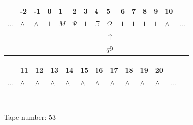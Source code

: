 \documentclass[11pt]{article}
\begin{document}
\begin{table}[H]
\centering
\begin{tabular}{lllllllllllllll}
 & -2 & -1 & 0 & 1 & 2 & 3 & 4 & 5 & 6 & 7 & 8 & 9 & 10 & \\
\hline
$...$ & \multicolumn{1}{|l|}{$\wedge$} & \multicolumn{1}{|l|}{$\wedge$} & \multicolumn{1}{|l|}{$1$} & \multicolumn{1}{|l|}{$M$} & \multicolumn{1}{|l|}{$\Psi$} & \multicolumn{1}{|l|}{$1$} & \multicolumn{1}{|l|}{$\Xi$} & \multicolumn{1}{|l|}{$\Omega$} & \multicolumn{1}{|l|}{$1$} & \multicolumn{1}{|l|}{$1$} & \multicolumn{1}{|l|}{$1$} & \multicolumn{1}{|l|}{$1$} & \multicolumn{1}{|l|}{$\wedge$} & $...$\\
\hline
&  &  &  &  &  &  &  & $\uparrow$ &  &  &  &  &  &  \\
&  &  &  &  &  &  &  & $ q9 $ &  &  &  &  &  &  \\
\end{tabular}
\begin{tabular}{llllllllllll}
 & 11 & 12 & 13 & 14 & 15 & 16 & 17 & 18 & 19 & 20 & \\
\hline
$...$ & \multicolumn{1}{|l|}{$\wedge$} & \multicolumn{1}{|l|}{$\wedge$} & \multicolumn{1}{|l|}{$\wedge$} & \multicolumn{1}{|l|}{$\wedge$} & \multicolumn{1}{|l|}{$\wedge$} & \multicolumn{1}{|l|}{$\wedge$} & \multicolumn{1}{|l|}{$\wedge$} & \multicolumn{1}{|l|}{$\wedge$} & \multicolumn{1}{|l|}{$\wedge$} & \multicolumn{1}{|l|}{$\wedge$} & $...$\\
\hline
&  &  &  &  &  &  &  &  &  &  &  \\
&  &  &  &  &  &  &  &  &  &  &  \\
\end{tabular}
\\
Tape number: 53
\noindent\makebox[\linewidth]{\hdashrule{\textwidth}{1pt}{1pt}}\end{table}
\end{document}
